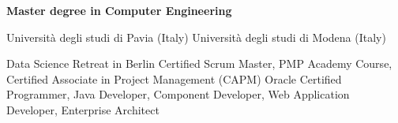 %
%
%

\textbf{Master degree in Computer Engineering}
\begin{scholarship}
					{Università degli studi di Pavia (Italy)}
					{Università degli studi di Modena (Italy)}
\end{scholarship}
\begin{scholarship}
					{Data Science Retreat in Berlin}
					{Certified Scrum Master, PMP Academy Course, Certified Associate in Project Management (CAPM)}
					{Oracle Certified Programmer, Java Developer, Component Developer, Web Application Developer, Enterprise Architect}
\end{scholarship}
					
					

